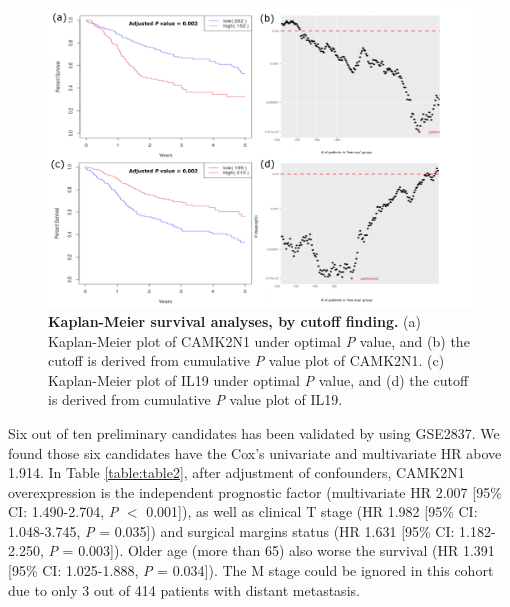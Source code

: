\documentclass[12pt, a4paper]{article}
\newcommand{\bcaption}[2]{\caption{\textbf{#1} #2}}
\begin{document}
\begin{figure}[hp]
\centering
\includegraphics[width=15cm]{Figure_4_CAMK2N1_IL19.pdf}
\bcaption{Kaplan-Meier survival analyses, by cutoff finding.}
{(a) Kaplan-Meier plot of CAMK2N1 under optimal \textit{P} value, and (b) the cutoff is derived from cumulative \textit{P} value plot of CAMK2N1. (c) Kaplan-Meier plot of IL19 under optimal \textit{P} value, and (d) the cutoff is derived from cumulative \textit{P} value plot of IL19.}
\label{fig:figure4}
\end{figure}

\clearpage

Six out of ten preliminary candidates has been validated by using GSE2837.
We found those six candidates have the Cox's univariate and multivariate HR above 1.914.
In Table \ref{table:table2}, %
after adjustment of confounders, \acrshort{CAMK2N1} overexpression is the independent prognostic factor (multivariate HR 2.007 [95\% CI: 1.490-2.704, \textit{P} $<$ 0.001]), as well as clinical T stage (HR 1.982 [95\% CI: 1.048-3.745, \textit{P} = 0.035]) and surgical margins status (HR 1.631 [95\% CI: 1.182-2.250, \textit{P} = 0.003]). 
Older age (more than 65) also worse the survival (HR 1.391 [95\% CI: 1.025-1.888, \textit{P} = 0.034]). 
The M stage could be ignored in this cohort due to only 3 out of 414 patients with distant metastasis.
\end{document}
